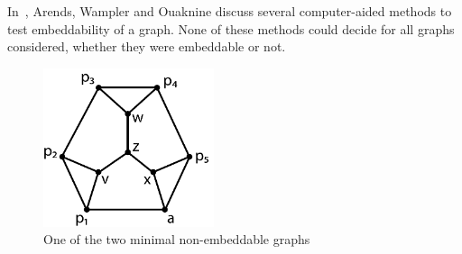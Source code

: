 \documentclass[adraft,copyright,creativecommons]{eptcs}
\theoremstyle{definition}
\theoremstyle{remark}
\begin{document}
In~\cite{aow11}, Arends, Wampler and Ouaknine discuss several
computer-aided methods
to test embeddability of a graph.  None of these methods could decide
for all graphs considered, whether they were embeddable or not.
\label{sec:emb}
\begin{figure}
\begin{center}
\includegraphics[width=50mm]{../graphs/unemb10-1-a.pdf}
\end{center}
\caption{One of the two minimal
        non-embeddable graphs
\label{fig:unemb-10-2}}
\end{figure}
\end{document}
